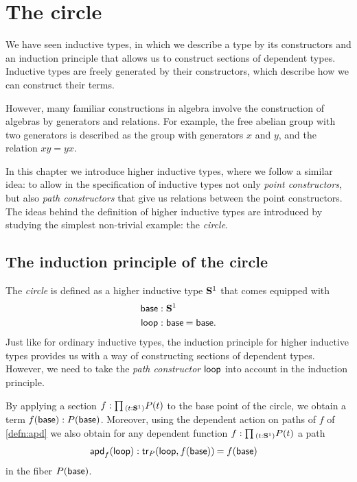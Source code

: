
\section{The circle}

We have seen inductive types, in which we describe a type by its constructors and an induction principle that allows us to construct sections of dependent types. Inductive types are freely generated by their constructors, which describe how we can construct their terms. 

However, many familiar constructions in algebra involve the construction of algebras by generators and relations. 
For example, the free abelian group with two generators is described as the group with generators $x$ and $y$, and the relation $xy=yx$. 

In this chapter we introduce higher inductive types, where we follow a similar idea: to allow in the specification of inductive types not only \emph{point constructors}, but also \emph{path constructors} that give us relations between the point constructors. 
The ideas behind the definition of higher inductive types are introduced by studying the simplest non-trivial example: the \emph{circle}.

\subsection{The induction principle of the circle}
The \emph{circle} is defined as a higher inductive type $\mathbf{S}^{1}$ that comes equipped with
\begin{align*}
\base & : \sphere{1} \\
\lloop & : \id{\base}{\base}.
\end{align*}
Just like for ordinary inductive types, the induction principle for higher inductive types provides us with a way of constructing sections of dependent types. However, we need to take the \emph{path constructor} $\mathsf{loop}$ into account in the induction principle. 

By applying a section $f:\prd{t:\sphere{1}}P(t)$ to the base point of the circle, we obtain a term $f(\mathsf{base}):P(\mathsf{base})$. Moreover, using the dependent action on paths of $f$ of \cref{defn:apd} we also obtain for any dependent function $f:\prd{t:\sphere{1}}P(t)$ a path
\begin{align*}
\apd{f}{\lloop} & : \id{\mathsf{tr}_P(\lloop,f(\base))}{f(\base)}
\end{align*}
in the fiber $P(\mathsf{base})$.

